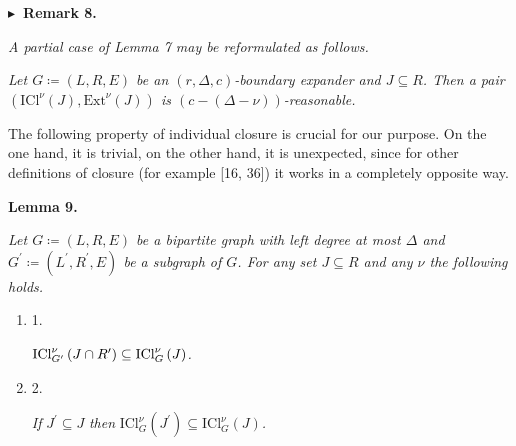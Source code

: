 

\par\medskip\noindent\textbf{
$\blacktriangleright$ Remark 8.
}\par



\emph{A partial case of Lemma 7 may be reformulated as follows.}\par




\emph{Let $G\coloneqq(L,R,E)$ be an $(r,\Delta,c)$-boundary expander and $J\subseteq R$. Then a pair
$(\mathrm{ICl}^{\nu}\left(J\right),\mathrm{Ext}^{\nu}\left(J\right))$ is $(c-(\Delta-\nu))$-reasonable.}\par






The following property of individual closure is crucial for our purpose. On the one hand, it is trivial, on
the other hand, it is unexpected, since for other definitions of closure (for example
[16, 36]) it works in a completely opposite way.\par





\par\medskip\noindent\textbf{
\textbf{Lemma 9}\textbf{.}
}\par



\emph{Let $G\coloneqq(L,R,E)$ be a bipartite graph with left degree at most $\Delta$ and $G^{\prime}\coloneqq(L^{\prime},R^{\prime},E)$ be a subgraph of $G$. For any set $J\subseteq R$ and any $\nu$ the following holds.}\par


\begin{enumerate}


\item[] 
1. 


$\mathrm{ICl}_{G^{\prime}}^{\nu}\left(J\cap R^{\prime}\right)\subseteq\mathrm{%
ICl}_{G}^{\nu}\left(J\right)$\emph{.}\par





\item[] 
2. 


\emph{If }$J^{\prime}\subseteq J$\emph{ then }$\mathrm{ICl}_{G}^{\nu}\left(J^{\prime}\right)\subseteq\mathrm{ICl}_{G}^{\nu}%
\left(J\right)$\emph{.}\par





\end{enumerate}



